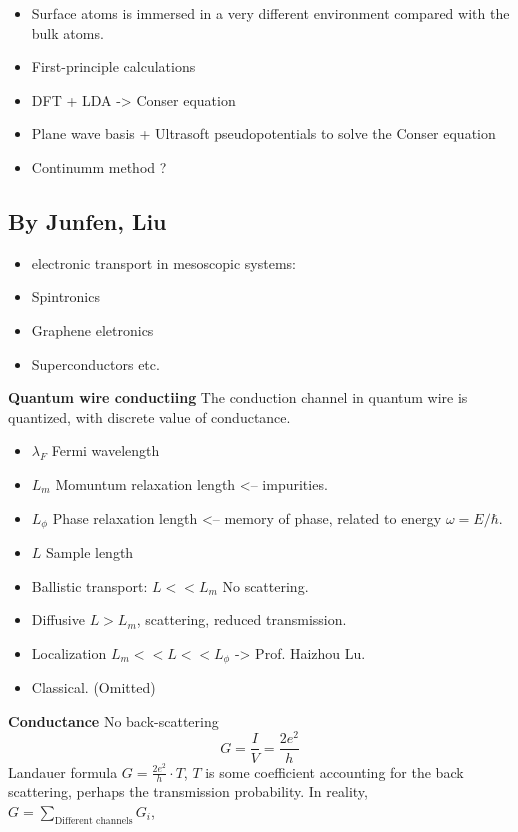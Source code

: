 \documentclass{article}
\numberwithin{equation}{subsection} %
\theoremstyle{definition}
\begin{document}
    \begin{itemize}
            \item Surface atoms is immersed in a very different environment
                    compared with the bulk atoms.
            \item First-principle calculations
            \item DFT + LDA -> Conser equation
            \item Plane wave basis + Ultrasoft pseudopotentials to solve the
                    Conser equation
            \item Continumm method ?
    \end{itemize}

    \subsection{By Junfen, Liu}
    \begin{itemize}
            \item electronic transport in mesoscopic systems:
            \item Spintronics
            \item Graphene eletronics
            \item Superconductors etc.
    \end{itemize}
    \textbf{Quantum wire conductiing}
    The conduction channel in quantum wire is quantized, with discrete value
    of conductance.
    \begin{itemize}
            \item $\lambda_F$ Fermi wavelength
            \item $L_m$ Momuntum relaxation length <-- impurities.
            \item $L_\phi$ Phase relaxation length <-- memory of phase,
                    related to energy $\omega = E/\hbar$.
            \item $L$ Sample length
    \end{itemize}
    \begin{itemize}
            \item Ballistic transport: $L << L_m$ No scattering.
            \item Diffusive $L>L_m$, scattering, reduced transmission.
            \item Localization $L_m<<L<<L_\phi$ -> Prof. Haizhou Lu.
            \item Classical. (Omitted)
    \end{itemize}
    \textbf{Conductance}
    No back-scattering $$ G = \frac{I}{V} = \frac{2e^2}{h}$$
    Landauer formula $G = \frac{2e^2}{h}\cdot T$, $T$ is some coefficient
    accounting for the back scattering, perhaps the transmission
    probability.
    In reality, $G=\sum_{\text{Different channels}}G_i$, 
\end{document}

